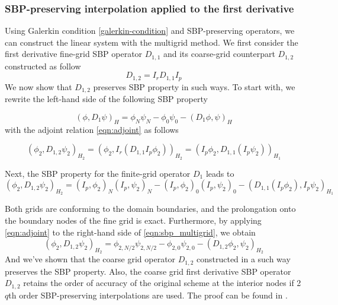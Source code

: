 \subsubsection{SBP-preserving interpolation applied to the first derivative}
Using Galerkin condition \autoref{galerkin-condition} and SBP-preserving operators, we can construct the linear system with the multigrid method. We first consider the first derivative fine-grid SBP operator $D_{1,1}$ and its coarse-grid counterpart $D_{1,2}$ constructed as follow
\begin{equation}
    D_{1,2} = I_r D_{1,1} I_p
\end{equation}
We now show that $D_{1,2}$ preserves SBP property in such ways. To start with, we rewrite the left-hand side of the following SBP property

\begin{equation}
    (\phi,D_1\psi)_H = \phi_N\psi_N - \phi_0\psi_0 - (D_1\phi,\psi)_H
\end{equation}
with the adjoint relation \autoref{eqn:adjoint} as follows

\begin{equation}
    (\phi_2,D_{1,2}\psi_2)_{H_2} = (\phi_2,I_r(D_{1,1}I_p\phi_2))_{H_2} = (I_p\phi_2,D_{1,1}(I_p\psi_2))_{H_1}
\end{equation}

Next, the SBP property for the finite-grid operator $D_1$ leads to
\begin{equation}
     (\phi_2,D_{1,2}\psi_2)_{H_2} = (I_p,\phi_2)_N(I_p,\psi_2)_N - (I_p,\phi_2)_0(I_p,\psi_2)_0 - (D_{1,1}(I_p\phi_2),I_p\psi_2)_{H_1}
     \label{eqn:sbp_multigrid}
\end{equation}

Both grids are conforming to the domain boundaries, and the prolongation onto the boundary nodes of the fine grid is exact. Furthermore, by applying \autoref{eqn:adjoint} to the right-hand side of \autoref{eqn:sbp_multigrid}, we obtain 
\begin{equation}
    (\phi_2,D_{1,2}\psi_2)_{H_2} = \phi_{2,N/2}\psi_{2,N/2} - \phi_{2,0}\psi_{2,0} - (D_{1,2}\phi_{2},\psi_{2})_{H_2}
\end{equation}
And we've shown that the coarse grid operator $D_{1,2}$ constructed in a such way preserves the SBP property. Also, the coarse grid first derivative SBP operator $D_{1,2}$ retains the order of accuracy of the original scheme at the interior nodes if 2$q$th order SBP-preserving interpolations are used. The proof can be found in \citep{ruggiu2018new}.

